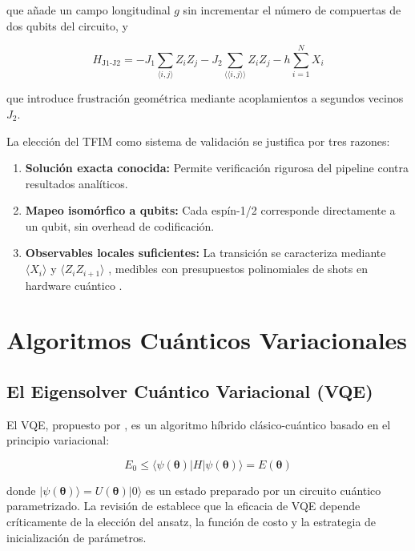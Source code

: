 \documentclass[11pt,a4paper,spanish]{book}
\begin{document}
\noindent que añade un campo longitudinal $g$ sin incrementar el número de compuertas de dos qubits del circuito, y

\begin{equation}
H_{\text{J1-J2}} = -J_1 \sum_{\langle i,j \rangle} Z_i Z_j - J_2 \sum_{\langle\langle i,j \rangle\rangle} Z_i Z_j - h \sum_{i=1}^{N} X_i
\label{eq:tfim_frustrated}
\end{equation}

\noindent que introduce frustración geométrica mediante acoplamientos a segundos vecinos $J_2$.

La elección del TFIM como sistema de validación se justifica por tres razones:

\begin{enumerate}
    \item \textbf{Solución exacta conocida:} Permite verificación rigurosa del pipeline contra resultados analíticos.
    \item \textbf{Mapeo isomórfico a qubits:} Cada espín-1/2 corresponde directamente a un qubit, sin overhead de codificación.
    \item \textbf{Observables locales suficientes:} La transición se caracteriza mediante $\langle X_i \rangle$ y $\langle Z_i Z_{i+1} \rangle$ \citep{dutta2015}, medibles con presupuestos polinomiales de shots en hardware cuántico \citep{cerezo2021}.
\end{enumerate}

\section{Algoritmos Cuánticos Variacionales}

\subsection{El Eigensolver Cuántico Variacional (VQE)}

El VQE, propuesto por \citet{peruzzo2014}, es un algoritmo híbrido clásico-cuántico basado en el principio variacional:

\begin{equation}
E_0 \leq \langle \psi(\boldsymbol{\theta}) | H | \psi(\boldsymbol{\theta}) \rangle = E(\boldsymbol{\theta})
\label{eq:variational}
\end{equation}

\noindent donde $|\psi(\boldsymbol{\theta})\rangle = U(\boldsymbol{\theta})|0\rangle$ es un estado preparado por un circuito cuántico parametrizado. La revisión de \citet{tilly2022} establece que la eficacia de VQE depende críticamente de la elección del ansatz, la función de costo y la estrategia de inicialización de parámetros.
\end{document}

